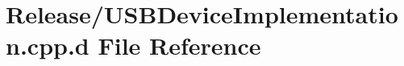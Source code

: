 \hypertarget{_release_2_u_s_b_device_implementation_8cpp_8d}{\section{\-Release/\-U\-S\-B\-Device\-Implementation.cpp.\-d \-File \-Reference}
\label{_release_2_u_s_b_device_implementation_8cpp_8d}
}

